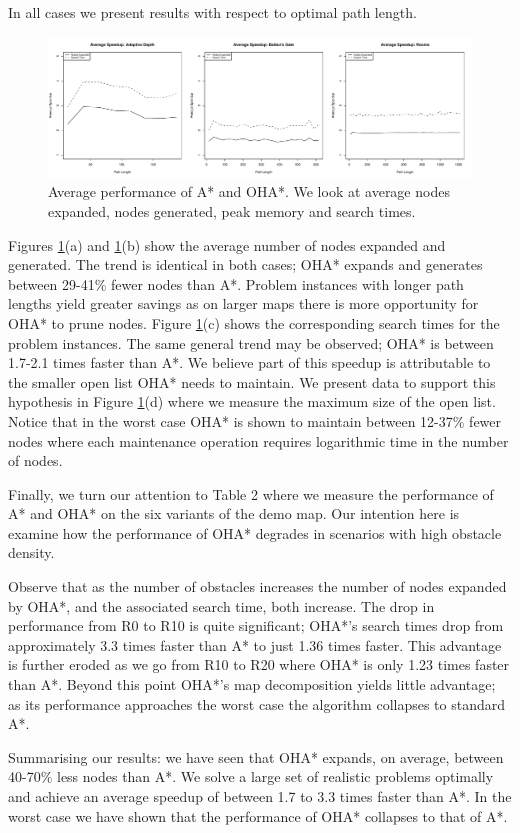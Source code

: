 In all cases we present results with respect to optimal path length.
\begin{figure}[t]
	\begin{center}
		       \includegraphics[width=1.9\columnwidth, trim = 20mm 17mm 20mm 5mm]{diagrams/speedup.pdf}
	\end{center}
	\caption{Average performance of A* and OHA*. We look at average nodes expanded, nodes generated,
	peak memory and search times.}
	\label{fig-searcheffort}
\end{figure}
\par \indent
Figures \ref{fig-searcheffort}(a) and \ref{fig-searcheffort}(b)  show the average number of 
nodes expanded and generated. 
The trend is identical in both cases; OHA* expands and generates between 29-41\% fewer nodes than A*.
Problem instances with longer path lengths yield greater savings as on larger maps there is more 
opportunity for OHA* to prune nodes. 
Figure \ref{fig-searcheffort}(c) shows the corresponding search times for the problem instances. 
The same general trend may be observed; OHA* is between 1.7-2.1 times faster than A*.
We believe part of this speedup is attributable to the smaller open list OHA* needs to maintain.
We present data to support this hypothesis in Figure \ref{fig-searcheffort}(d) where we measure 
the maximum size of the open list. 
Notice that in the worst case OHA* is shown to maintain between 12-37\% fewer nodes where each
maintenance operation requires logarithmic time in the number of nodes.
\par
Finally, we turn our attention to Table 2 where we measure the 
performance of A* and OHA* on the six variants of the demo map.
Our intention here is examine how the performance of OHA* degrades in scenarios with
high obstacle density.

Observe that as the number of obstacles increases the number of nodes expanded by OHA*, and the
associated search time, both increase. 
The drop in performance from R0 to R10 is quite significant; OHA*'s search times drop
from approximately 3.3 times faster than A* to just 1.36 times faster.
This advantage is further eroded as we go from R10 to R20 where OHA* is only 
1.23 times faster than A*.
Beyond this point OHA*'s map decomposition yields little advantage; 
as its performance approaches the worst case the algorithm collapses
to standard A*.
\par
Summarising our results: we have seen that OHA* expands, on average, between 40-70\% less nodes than A*.
We solve a large set of realistic problems optimally and achieve an average speedup of between 1.7 to 
3.3 times faster than A*.
In the worst case we have shown that the performance of OHA* collapses to that of A*.
